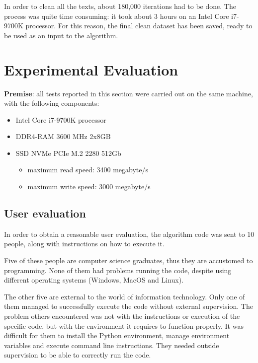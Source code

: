 \vspace{4mm}
In order to clean all the texts, about 180,000 iterations had to be done. The process was quite time consuming: it took about 3 hours on an Intel Core i7-9700K processor. For this reason, the final clean dataset has been saved, ready to be used as an input to the algorithm.


\section{Experimental Evaluation}\label{sect_exp_eval}

\textbf{Premise}: all tests reported in this section were carried out on the same machine, with the following components:
\begin{itemize}
  \item Intel Core i7-9700K processor
  \item DDR4-RAM 3600 MHz 2x8GB
  \item SSD NVMe PCIe M.2 2280 512Gb
  \begin{itemize}
    \item maximum read speed: 3400 megabyte/s
    \item maximum write speed: 3000 megabyte/s
  \end{itemize}
\end{itemize}

\subsection*{User evaluation}
In order to obtain a reasonable user evaluation, the algorithm code was sent to 10 people, along with instructions on how to execute it.

Five of these people are computer science graduates, thus they are accustomed to programming. None of them had problems running the code, despite using different operating systems (Windows, MacOS and Linux).

The other five are external to the world of information technology. Only one of them managed to successfully execute the code without external supervision. The problem others encountered was not with the instructions or execution of the specific code, but with the environment it requires to function properly. It was difficult for them to install the Python environment, manage environment variables and execute command line instructions. They needed outside supervision to be able to correctly run the code.

